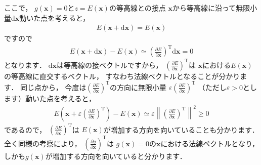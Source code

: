 ﻿\documentclass{jsarticle}
\begin{document}
ここで，
$g(\boldsymbol{x})=0$と$z=E(\boldsymbol{x})$の等高線との接点
$\boldsymbol{x}$から等高線に沿って無限小量$\mathrm{d}\boldsymbol{x}$動いた点を考えると，
\begin{align*}
E(\boldsymbol{x}+\mathrm{d}\boldsymbol{x})=E(\boldsymbol{x})
\end{align*}
ですので
\begin{align*}
E(\boldsymbol{x}+\mathrm{d}\boldsymbol{x})-E(\boldsymbol{x})
\simeq\left(\frac{\partial E}{\partial\boldsymbol{x}}\right)^{\mathrm{T}}\mathrm{d}\boldsymbol{x}
=0
\end{align*}
となります．
$\mathrm{d}\boldsymbol{x}$は等高線の接ベクトルですから，
$\left(\frac{\partial E}{\partial\boldsymbol{x}}\right)^{\mathrm{T}}$は
$\boldsymbol{x}$における$E(\boldsymbol{x})$の等高線に直交するベクトル，
すなわち法線ベクトルとなることが分かります．
同じ点から，
今度は$\left(\frac{\partial E}{\partial\boldsymbol{x}}\right)^{\mathrm{T}}$の方向に無限小量
$\varepsilon\left(\frac{\partial E}{\partial\boldsymbol{x}}\right)^{\mathrm{T}}$
（ただし$\varepsilon>0$とします）動いた点を考えると，
\begin{align*}
E\left(\boldsymbol{x}+\varepsilon\left(\frac{\partial E}{\partial\boldsymbol{x}}\right)^{\mathrm{T}}\right)
-E(\boldsymbol{x})
\simeq\varepsilon\left\|\left(\frac{\partial E}{\partial\boldsymbol{x}}\right)^{\mathrm{T}}\right\|^{2}
\geq 0
\end{align*}
であるので，
$\left(\frac{\partial E}{\partial\boldsymbol{x}}\right)^{\mathrm{T}}$は
$E(\boldsymbol{x})$が増加する方向を向いていることも分かります．
全く同様の考察により，
$\left(\frac{\partial g}{\partial\boldsymbol{x}}\right)^{\mathrm{T}}$は
$g(\boldsymbol{x})=0$の$\boldsymbol{x}$における法線ベクトルとなり，
しかも$g(\boldsymbol{x})$が増加する方向を向いていると分かります．
\end{document}
